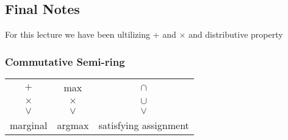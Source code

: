 \documentclass{article}
\begin{document}
\subsection{Final Notes}
For this lecture we have been ultilizing + and $\times$ and distributive property
\subsubsection{Commutative Semi-ring}
\begin{center}
\begin{tabular}{ c c c }
$+$ & max & $\cap$\\ 
 $\times$ & $\times$& $\cup$ \\  
 $ \vee$&  $ \vee$&  $\vee$\\
 marginal & argmax & satisfying assignment    
\end{tabular}
\end{center}
\end{document}
